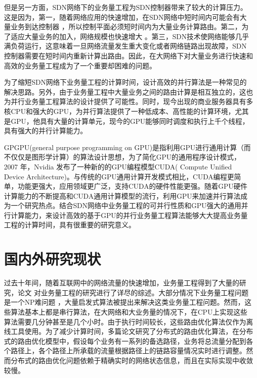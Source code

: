 \documentclass[master]{thesis-uestc}
\begin{document}
但是另一方面，SDN网络下的业务量工程为SDN控制器带来了较大的计算压力。这是因为，第一，随着网络应用的快速增加，在SDN网络中短时间内可能会有大量业务到达控制器 ，所以控制平面必须短时间内为大量业务计算路由。第二，为了适应大量业务的加入，网络规模也快速增大 。第三，SDN技术使网络能够几乎满负荷运行，这意味着一旦网络流量发生重大变化或者网络链路出现故障，SDN控制器需要在短时间内重新计算出路由。因此，在大网络下对大量业务进行快速和高效的业务量工程成为了一个重要却困难的问题。

为了缩短SDN网络下业务量工程的计算时间，设计高效的并行算法是一种常见的解决思路。另外，由于业务量工程中大量业务之间的路由计算是相互独立的，这也为并行业务量工程算法的设计提供了可能性。同时，现今出现的商业服务器具有多核CPU和强大的GPU，为并行算法提供了一种低成本、高性能的计算环境，尤其是GPU，他具有大量的计算单元，现今的GPU能够同时调度和执行上千个线程，具有强大的并行计算能力。

GPGPU(general purpose programming on GPU)是指利用GPU进行通用计算（而不仅仅是图形学计算）的算法设计思想，为了简化GPU的通用程序设计模式，2007 年，Nvidia 发布了一种新的的GPU编程模型CUDA( Compute Unified Device Architecture)。与传统的GPU通用计算开发模式相比，CUDA编程更简单，功能更强大，应用领域更广泛，支持CUDA的硬件性能更强。随着GPU硬件计算能力的不断提高和CUDA通用计算模型的流行，利用GPU来加速并行算法成为一个研究热点。结合SDN网络中业务量工程的可并行性质和GPU强大的通用并行计算能力，来设计高效的基于GPU的并行业务量工程算法能够大大提高业务量工程的计算时间，具有很重要的研究意义。
\section{国内外研究现状}

过去十年间，随着互联网中的网络流量的快速增加，业务量工程得到了大量的研究，论文 对业务量工程的研究进行了详尽的综述。大部分情况下业务量工程问题是一个NP难问题 ，大量启发式算法被提出来解决这类业务量工程问题。然而，这些算法基本上都是串行算法，在大网络和大业务量的情况下，在CPU上实现这些算法需要几分钟甚至是几个小时。由于执行时间较长，这些路由优化算法仅作为离线工具使用。为了减少计算时间，多篇论文研究了分布式的路由优化算法，在分布式的路由优化模型中，假设每个业务有一系列的备选路径，业务将总流量分配到各个路径上，各个路径上所承载的流量根据路径上的链路容量情况实时进行调整。然而分布式的路由优化问题依赖于精确实时的网络状态信息，而且在实际实现中收敛较慢。
\end{document}
